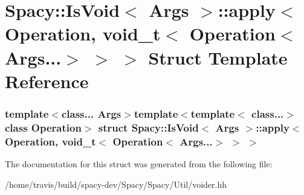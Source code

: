 \hypertarget{structSpacy_1_1IsVoid_1_1apply_3_01Operation_00_01void__t_3_01Operation_3_01Args_8_8_8_4_01_4_01_4}{\section{\-Spacy\-:\-:\-Is\-Void$<$ \-Args $>$\-:\-:apply$<$ \-Operation, void\-\_\-t$<$ \-Operation$<$ \-Args...$>$ $>$ $>$ \-Struct \-Template \-Reference}
\label{structSpacy_1_1IsVoid_1_1apply_3_01Operation_00_01void__t_3_01Operation_3_01Args_8_8_8_4_01_4_01_4}
}
\subsubsection*{template$<$class... \-Args$>$template$<$template$<$ class...$>$ class \-Operation$>$ struct Spacy\-::\-Is\-Void$<$ Args $>$\-::apply$<$ Operation, void\-\_\-t$<$ Operation$<$ Args...$>$ $>$ $>$}



\-The documentation for this struct was generated from the following file\-:\begin{DoxyCompactItemize}
\item 
/home/travis/build/spacy-\/dev/\-Spacy/\-Spacy/\-Util/voider.\-hh\end{DoxyCompactItemize}
